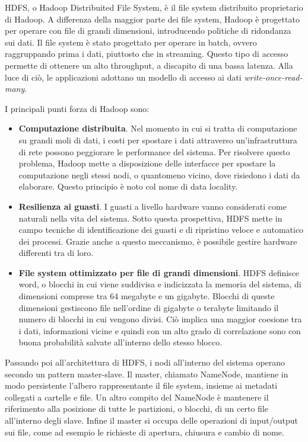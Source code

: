 HDFS, o Hadoop Distribuited File System, è il file system distribuito proprietario di Hadoop.
A differenza della maggior parte dei file system, Hadoop è progettato per operare con file di grandi dimensioni, introducendo politiche di ridondanza sui dati.
Il file system è stato progettato per operare in batch, ovvero raggruppando prima i dati, piuttosto che in streaming.
Questo tipo di accesso permette di ottenere un alto throughput, a discapito di una bassa latenza.
Alla luce di ciò, le applicazioni adottano un modello di accesso ai dati \textit{write-once-read-many}.

I principali punti forza di Hadoop sono:

\begin{itemize}
    \item \textbf{Computazione distribuita}.
    Nel momento in cui si tratta di computazione su grandi moli di dati, i costi per spostare i dati attraverso un'infrastruttura di rete possono peggiorare le performance del sistema.
    Per risolvere questo problema, Hadoop mette a disposizione delle interfacce per spostare la computazione negli stessi nodi, o quantomeno vicino, dove risiedono i dati da elaborare.
    Questo principio è noto col nome di data locality.
    
    \item \textbf{Resilienza ai guasti}.
    I guasti a livello hardware vanno considerati come naturali nella vita del sistema.
    Sotto questa prospettiva, HDFS mette in campo tecniche di identificazione dei guasti e di ripristino veloce e automatico dei processi.
    Grazie anche a questo meccanismo, è possibile gestire hardware differenti tra di loro.
    
    \item  \textbf{File system ottimizzato per file di grandi dimensioni}.
    HDFS definisce word, o blocchi in cui viene suddivisa e indicizzata la memoria del sistema, di dimensioni comprese tra 64 megabyte e un gigabyte.
    Blocchi di queste dimensioni gestiscono file nell'ordine di gigabyte o terabyte limitando il numero di blocchi in cui vengono divisi.
    Ciò implica una maggior coesione tra i dati, informazioni vicine e quindi con un alto grado di correlazione sono con buona probabilità salvate all'interno dello stesso blocco.
    
\end{itemize}

Passando poi all'architettura di HDFS, i nodi all'interno del sistema operano secondo un pattern master-slave.
Il master, chiamato NameNode, mantiene in modo persistente l'albero rappresentante il file system, insieme ai metadati collegati a cartelle e file.
Un altro compito del NameNode è mantenere il riferimento alla posizione di tutte le partizioni, o blocchi, di un certo file all'interno degli slave.
Infine il master si occupa delle operazioni di input/output sui file, come ad esempio le richieste di apertura, chiusura e cambio di nome.

